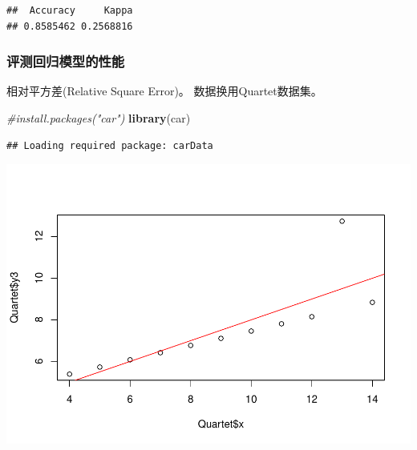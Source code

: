 \documentclass[
]{article}
\newenvironment{Shaded}{\begin{snugshade}}{\end{snugshade}}
\newcommand{\CommentTok}[1]{\textcolor[rgb]{0.56,0.35,0.01}{\textit{#1}}}
\newcommand{\DataTypeTok}[1]{\textcolor[rgb]{0.13,0.29,0.53}{#1}}
\newcommand{\KeywordTok}[1]{\textcolor[rgb]{0.13,0.29,0.53}{\textbf{#1}}}
\newcommand{\NormalTok}[1]{#1}
\newcommand{\OperatorTok}[1]{\textcolor[rgb]{0.81,0.36,0.00}{\textbf{#1}}}
\newcommand{\StringTok}[1]{\textcolor[rgb]{0.31,0.60,0.02}{#1}}
\begin{document}
\begin{verbatim}
##  Accuracy     Kappa 
## 0.8585462 0.2568816
\end{verbatim}

\hypertarget{ux8bc4ux6d4bux56deux5f52ux6a21ux578bux7684ux6027ux80fd}{%
\subsubsection{评测回归模型的性能}\label{ux8bc4ux6d4bux56deux5f52ux6a21ux578bux7684ux6027ux80fd}}

相对平方差(Relative Square Error)。 数据换用Quartet数据集。

\begin{Shaded}
\begin{Highlighting}[]
\CommentTok{#install.packages("car")}
\KeywordTok{library}\NormalTok{(car)}
\end{Highlighting}
\end{Shaded}

\begin{verbatim}
## Loading required package: carData
\end{verbatim}

\begin{Shaded}
\end{Shaded}

\includegraphics{R_FinalReport_files/figure-latex/unnamed-chunk-31-1.pdf}
\end{document}
